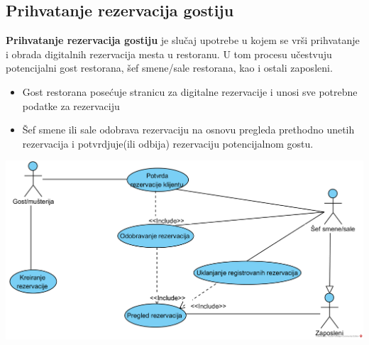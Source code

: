 \documentclass{article}
\begin{document}
\subsection{Prihvatanje rezervacija gostiju}
\textbf{Prihvatanje rezervacija gostiju} je slučaj upotrebe u kojem se vrši prihvatanje i obrada digitalnih rezervacija mesta u restoranu. U tom procesu učestvuju potencijalni gost restorana, šef smene/sale restorana, kao i ostali zaposleni.\\

\begin{itemize}
\item Gost restorana posećuje stranicu za digitalne rezervacije i unosi sve potrebne podatke za rezervaciju
\item Šef smene ili sale odobrava rezervaciju na osnovu pregleda prethodno unetih rezervacija i potvrdjuje(ili odbija) rezervaciju potencijalnom gostu.
\end{itemize}
\vspace{1cm}
\includegraphics[width=\textwidth]{SU_5_prihvatanje_rezervacija.png}
\end{document}
